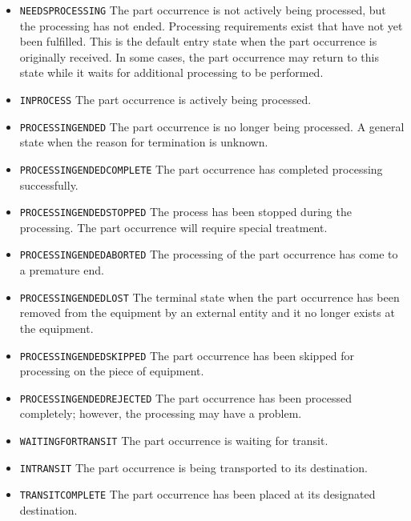 \begin{itemize}
\item \texttt{NEEDS\textunderscore PROCESSING} \newline The part occurrence is not actively being processed, but the processing has not ended. Processing requirements exist that have not yet been fulfilled. This is the default entry state when the part occurrence is originally received. In some cases, the part occurrence may return to this state while it waits for additional processing to be performed. 
\item \texttt{IN\textunderscore PROCESS} \newline The part occurrence is actively being processed. 
\item \texttt{PROCESSING\textunderscore ENDED} \newline The part occurrence is no longer being processed. A general state when the reason for termination is unknown. 
\item \texttt{PROCESSING\textunderscore ENDED\textunderscore COMPLETE} \newline The part occurrence has completed processing successfully. 
\item \texttt{PROCESSING\textunderscore ENDED\textunderscore STOPPED} \newline The process has been stopped during the processing. The part occurrence will require special treatment. 
\item \texttt{PROCESSING\textunderscore ENDED\textunderscore ABORTED} \newline The processing of the part occurrence has come to a premature end. 
\item \texttt{PROCESSING\textunderscore ENDED\textunderscore LOST} \newline The terminal state when the part occurrence has been removed from the equipment by an external entity and it no longer exists at the equipment. 
\item \texttt{PROCESSING\textunderscore ENDED\textunderscore SKIPPED} \newline The part occurrence has been skipped for processing on the piece of equipment. 
\item \texttt{PROCESSING\textunderscore ENDED\textunderscore REJECTED} \newline The part occurrence has been processed completely; however, the processing may have a problem. 
\item \texttt{WAITING\textunderscore FOR\textunderscore TRANSIT} \newline The part occurrence is waiting for transit. 
\item \texttt{IN\textunderscore TRANSIT} \newline The part occurrence is being transported to its destination. 
\item \texttt{TRANSIT\textunderscore COMPLETE} \newline The part occurrence has been placed at its designated destination. 
\end{itemize}



